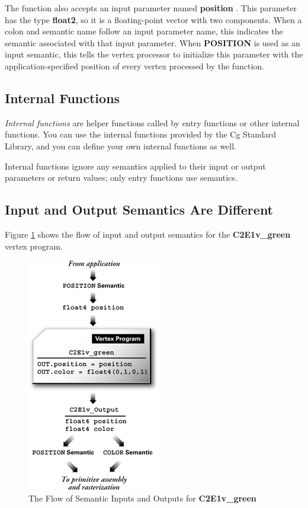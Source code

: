 \documentclass{book}
\begin{document}
The function also accepts an input parameter named \textbf{position} . This parameter has the type \textbf{float2}, so it is a floating-point vector with two components. When a colon and semantic name follow an input parameter name, this indicates the semantic associated with that input parameter. When \textbf{POSITION} is used as an input semantic, this tells the vertex processor to initialize this parameter with the application-specified position of every vertex processed by the function.

\subsection*{Internal Functions}

\textit{Internal functions} are helper functions called by entry functions or other internal functions. You can use the internal functions provided by the Cg Standard Library, and you can define your own internal functions as well.

Internal functions ignore any semantics applied to their input or output parameters or return values; only entry functions use semantics.

\subsection{Input and Output Semantics Are Different}

Figure \ref{fig:2-1} shows the flow of input and output semantics for the \textbf{C2E1v\_green} vertex program.

\begin{figure}
    \centering
    \includegraphics[width=0.5\linewidth]{Images/fig2_1.jpg}
    \caption{The Flow of Semantic Inputs and Outputs for \textbf{C2E1v\_green}}
    \label{fig:2-1}
\end{figure}
\end{document}
